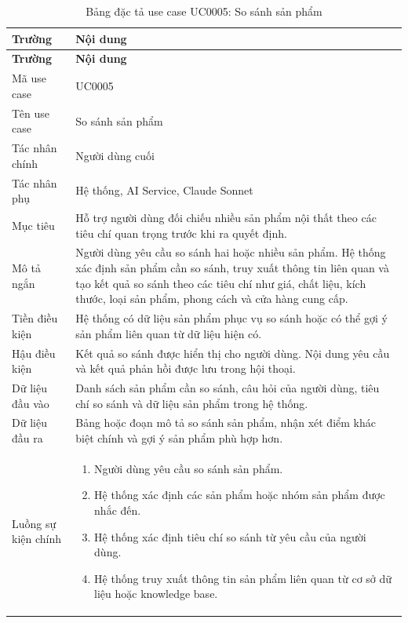 \documentclass[../DoAn.tex]{subfiles}
\begin{document}
\begin{longtable}{|p{}|p{}|}
\caption{Bảng đặc tả use case UC0005: So sánh sản phẩm}
\label{table:UC0005} \\
\hline
\textbf{Trường} & \textbf{Nội dung} \\
\hline
\endfirsthead

\hline
\textbf{Trường} & \textbf{Nội dung} \\
\hline
\endhead

Mã use case & UC0005 \\
\hline
Tên use case & So sánh sản phẩm \\
\hline
Tác nhân chính & Người dùng cuối \\
\hline
Tác nhân phụ & Hệ thống, AI Service, Claude Sonnet \\
\hline
Mục tiêu & Hỗ trợ người dùng đối chiếu nhiều sản phẩm nội thất theo các tiêu chí quan trọng trước khi ra quyết định. \\
\hline
Mô tả ngắn & Người dùng yêu cầu so sánh hai hoặc nhiều sản phẩm. Hệ thống xác định sản phẩm cần so sánh, truy xuất thông tin liên quan và tạo kết quả so sánh theo các tiêu chí như giá, chất liệu, kích thước, loại sản phẩm, phong cách và cửa hàng cung cấp. \\
\hline
Tiền điều kiện & Hệ thống có dữ liệu sản phẩm phục vụ so sánh hoặc có thể gợi ý sản phẩm liên quan từ dữ liệu hiện có. \\
\hline
Hậu điều kiện & Kết quả so sánh được hiển thị cho người dùng. Nội dung yêu cầu và kết quả phản hồi được lưu trong hội thoại. \\
\hline
Dữ liệu đầu vào & Danh sách sản phẩm cần so sánh, câu hỏi của người dùng, tiêu chí so sánh và dữ liệu sản phẩm trong hệ thống. \\
\hline
Dữ liệu đầu ra & Bảng hoặc đoạn mô tả so sánh sản phẩm, nhận xét điểm khác biệt chính và gợi ý sản phẩm phù hợp hơn. \\
\hline
Luồng sự kiện chính &
\begin{minipage}[t]{0.68\textwidth}
\begin{enumerate}
    \item Người dùng yêu cầu so sánh sản phẩm.
    \item Hệ thống xác định các sản phẩm hoặc nhóm sản phẩm được nhắc đến.
    \item Hệ thống xác định tiêu chí so sánh từ yêu cầu của người dùng.
    \item Hệ thống truy xuất thông tin sản phẩm liên quan từ cơ sở dữ liệu hoặc knowledge base.

\end{enumerate}
\end{minipage}
\end{longtable}
\end{document}
